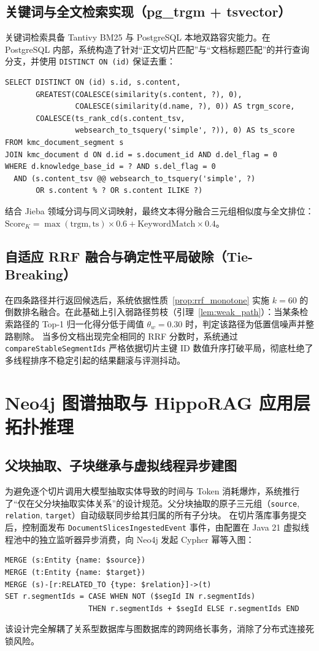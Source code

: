 \subsection{关键词与全文检索实现（pg\_trgm + tsvector）}
关键词检索具备 Tantivy BM25 与 PostgreSQL 本地双路容灾能力。在 PostgreSQL 内部，系统构造了针对“正文切片匹配”与“文档标题匹配”的并行查询分支，并使用 \texttt{DISTINCT ON (id)} 保证去重：
\begin{verbatim}
SELECT DISTINCT ON (id) s.id, s.content,
       GREATEST(COALESCE(similarity(s.content, ?), 0),
                COALESCE(similarity(d.name, ?), 0)) AS trgm_score,
       COALESCE(ts_rank_cd(s.content_tsv, 
                websearch_to_tsquery('simple', ?)), 0) AS ts_score
FROM kmc_document_segment s
JOIN kmc_document d ON d.id = s.document_id AND d.del_flag = 0
WHERE d.knowledge_base_id = ? AND s.del_flag = 0
  AND (s.content_tsv @@ websearch_to_tsquery('simple', ?)
       OR s.content % ? OR s.content ILIKE ?)
\end{verbatim}
结合 Jieba 领域分词与同义词映射，最终文本得分融合三元组相似度与全文排位：$\text{Score}_K = \max(\text{trgm}, \text{ts}) \times 0.6 + \text{KeywordMatch} \times 0.4$。

\subsection{自适应 RRF 融合与确定性平局破除（Tie-Breaking）}
在四条路径并行返回候选后，系统依据性质~\ref{prop:rrf_monotone} 实施 $k=60$ 的倒数排名融合。在此基础上引入弱路径剪枝（引理~\ref{lem:weak_path}）：当某条检索路径的 Top-1 归一化得分低于阈值 $\theta_w = 0.30$ 时，判定该路径为低置信噪声并整路剔除。
当多份文档出现完全相同的 RRF 分数时，系统通过 \texttt{compareStableSegmentIds} 严格依据切片主键 ID 数值升序打破平局，彻底杜绝了多线程排序不稳定引起的结果翻滚与评测抖动。

\section{Neo4j 图谱抽取与 HippoRAG 应用层拓扑推理}

\subsection{父块抽取、子块继承与虚拟线程异步建图}
为避免逐个切片调用大模型抽取实体导致的时间与 Token 消耗爆炸，系统推行了“仅在父分块抽取实体关系”的设计规范。父分块抽取的原子三元组（\texttt{source}, \texttt{relation}, \texttt{target}）自动级联同步给其归属的所有子分块。
在切片落库事务提交后，控制面发布 \texttt{DocumentSlicesIngestedEvent} 事件，由配置在 Java 21 虚拟线程池中的独立监听器异步消费，向 Neo4j 发起 Cypher 幂等入图：
\begin{verbatim}
MERGE (s:Entity {name: $source})
MERGE (t:Entity {name: $target})
MERGE (s)-[r:RELATED_TO {type: $relation}]->(t)
SET r.segmentIds = CASE WHEN NOT ($segId IN r.segmentIds)
                   THEN r.segmentIds + $segId ELSE r.segmentIds END
\end{verbatim}
该设计完全解耦了关系型数据库与图数据库的跨网络长事务，消除了分布式连接死锁风险。

